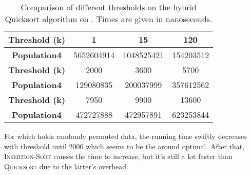 \begin{table}[H]
\centering
\begin{tabular}{|c|c|c|c|}
\hline
\textbf{Threshold (k)} & 1 & 15 & 120 \\ \hline
\textbf{Population4}   & 5652604914 & 1048525421 & 154203512 \\ \hline
\hline
\textbf{Threshold (k)} & 2000 & 3600 & 5700 \\ \hline
\textbf{Population4}   & 129080835 & 200037999 & 357612562 \\ \hline
\hline
\textbf{Threshold (k)} & 7950 & 9900 & 13600 \\ \hline
\textbf{Population4}   & 472727888 & 472957891 & 623253844 \\ \hline
\end{tabular}
\caption{Comparison of different thresholds on the hybrid Quicksort algorithm on . Times are given in nanoseconds.}
\label{table:pop4}
\end{table}
For  which holds randomly permuted data, the running time swiftly decreases with threshold until 2000 which seems to be the around optimal. After that, \textsc{Insertion-Sort} causes the time to increase, but it's still a lot faster than \textsc{Quicksort} due to the latter's overhead.